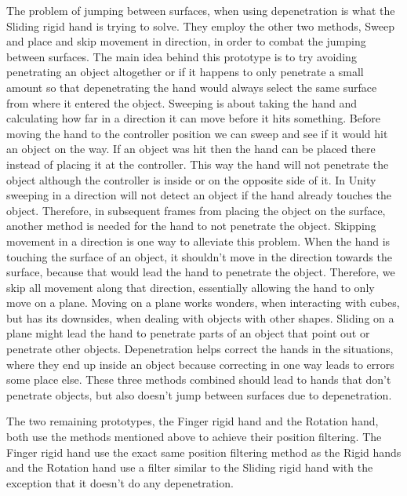 The problem of jumping between surfaces, when using depenetration is what the Sliding rigid hand is trying to solve. They employ the other two methods, Sweep and place and skip movement in direction, in order to combat the jumping between surfaces. The main idea behind this prototype is to try avoiding penetrating an object altogether or if it happens to only penetrate a small amount so that depenetrating the hand would always select the same surface from where it entered the object. Sweeping is about taking the hand and calculating how far in a direction it can move before it hits something. Before moving the hand to the controller position we can sweep and see if it would hit an object on the way. If an object was hit then the hand can be placed there instead of placing it at the controller. This way the hand will not penetrate the object although the controller is inside or on the opposite side of it. In Unity sweeping in a direction will not detect an object if the hand already touches the object. Therefore, in subsequent frames from placing the object on the surface, another method is needed for the hand to not penetrate the object. Skipping movement in a direction is one way to alleviate this problem. When the hand is touching the surface of an object, it shouldn't move in the direction towards the surface, because that would lead the hand to penetrate the object. Therefore, we skip all movement along that direction, essentially allowing the hand to only move on a plane. Moving on a plane works wonders, when interacting with cubes, but has its downsides, when dealing with objects with other shapes. Sliding on a plane might lead the hand to penetrate parts of an object that point out or penetrate other objects. Depenetration helps correct the hands in the situations, where they end up inside an object because correcting in one way leads to errors some place else. These three methods combined should lead to hands that don't penetrate objects, but also doesn't jump between surfaces due to depenetration.

The two remaining prototypes, the Finger rigid hand and the Rotation hand, both use the methods mentioned above to achieve their position filtering. The Finger rigid hand use the exact same position filtering method as the Rigid hands and the Rotation hand use a filter similar to the Sliding rigid hand with the exception that it doesn't do any depenetration.


